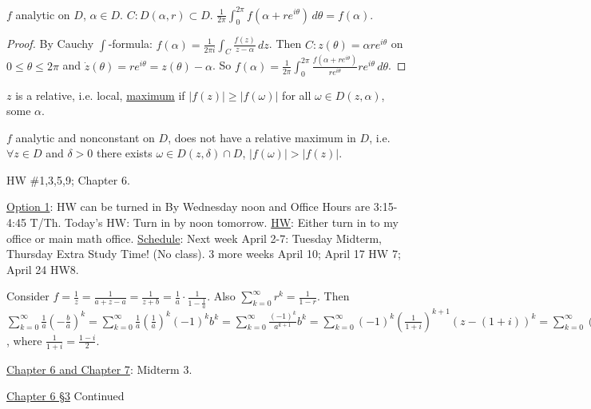 \documentclass[]{article}
\begin{document}
\begin{theorem}
	 $f$ analytic on $D$, $\alpha\in D$. $C:D(\alpha,r)\subset D$. $\frac{1}{2\pi} \int_0^{2\pi} f(\alpha + re^{i\theta}) \, d\theta = f(\alpha)$.
\end{theorem}
\begin{proof}
	By Cauchy $\int$-formula: $f(\alpha) = \frac{1}{2\pi i} \int_C \frac{f(z)}{z-\alpha} \, dz$. Then $C:z(\theta) = \alpha re^{i\theta}$ on $0\leq \theta\leq 2\pi$ and $\dot{z}(\theta) = re^{i\theta} = z(\theta)-\alpha$. So $f(\alpha) = \frac{1}{2\pi} \int_0^{2\pi} \frac{f(\alpha + re^{i\theta})}{re^{i\theta}} re^{i\theta} \, d\theta$.
\end{proof}
\begin{definition}
	$z$ is a relative, i.e. local, \underline{maximum} if $|f(z)|\geq |f(\omega)|$ for all $\omega\in D(z,\alpha)$, some $\alpha$.
\end{definition}
\begin{theorem}
	 $f$ analytic and nonconstant on $D$, does not have a relative maximum in $D$, i.e. $\forall z\in D$ and $\delta>0$ there exists $\omega\in D(z,\delta) \cap D$, $|f(\omega)| > |f(z)|$.
\end{theorem}

HW \#1,3,5,9; Chapter 6.

\underline{Option 1}: HW can be turned in By Wednesday noon and Office Hours are 3:15-4:45 T/Th. Today's HW: Turn in by noon tomorrow. \underline{HW}: Either turn in to my office or main math office. 
\underline{Schedule}: Next week April 2-7: Tuesday Midterm, Thursday Extra Study Time! (No class). 3 more weeks April 10; April 17 HW 7; April 24 HW8.

\begin{example}
	[HW6 Problem 1] Consider $f = \frac{1}{z} = \frac{1}{a+z-a} = \frac{1}{z+b} = \frac{1}{a}\cdot \frac{1}{1-\frac{1}{a}}$. Also $\sum_{k=0}^\infty r^k = \frac{1}{1-r}$. Then $\sum_{k=0}^\infty \frac{1}{a}\left(-\frac{b}{a}\right)^k = \sum_{k=0}^\infty \frac{1}{a} \left(\frac{1}{a}\right)^k (-1)^k b^k = \sum_{k=0}^\infty \frac{(-1)^k}{a^{k+1}} b^k = \sum_{k=0}^\infty (-1)^k \left(\frac{1}{1+i} \right)^{k+1} (z-(1+i))^k = \sum_{k=0}^\infty (-1)^k \left(\frac{1-i}{2}\right)^{k+1}(z-(i+i))^k $, where $\frac{1}{1+i} = \frac{1-i}{2}$.
\end{example}

\underline{Chapter 6 and Chapter 7}: Midterm 3.

\underline{Chapter 6 \S3} Continued
\end{document}
